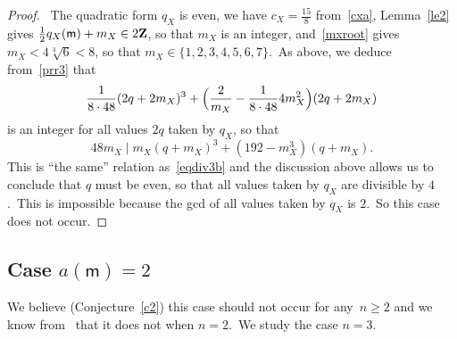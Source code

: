 \documentclass[12pt]{amsart}
\def\Z{{\bf Z}}
\def\R{{\bf R}}
\DeclareMathOperator{\ch}{ch}
\theoremstyle{remark}
\newtheorem{rema}[lemm]{Remark}
\def\lll{\ensuremath{\mathsf l}}
\def\mm{\ensuremath{\mathsf m}}
\begin{document}
\begin{proof}
\noindent{\bf{Assume  $ q_X(\lll,\mm)=2$.}}\ The quadratic form $q_X$ is even, we have $c_X=\frac{15}8$ from~\eqref{cxa},   Lemma~\ref{le2} gives $\frac12 q_X(\mm)+ m_X\in 2\Z$, so that $m_X$ is an integer, and~\eqref{mxroot} gives $m_X<4\sqrt[3]{6}<8$, so that $m_X \in\{1,2,3,4,5,6,7\}$.\ As above, we  deduce from~\eqref{prr3} that
 $$ \frac{1}{8\cdot 48}(2q+ 2m_X)^3+\Bigl(\frac{2}{m_X}-\frac{1}{8\cdot 48}4m_X^2\Bigr)(2q+ 2m_X) $$
is an integer for all values $2q$ taken by $q_X$, so that 
$$48m_X\mid    m_X(q+m_X)^3+ (192- m_X^3 )(q+m_X).
$$
This is ``the same'' relation as~\eqref{eqdiv3b} and the discussion above allows us to conclude that $q$ must be even, so that all values taken by $q_X$ are divisible by $4$.\ This is   impossible because   the gcd of all values taken  by $q_X$ is  $2$.\ So this case does not occur. 
%
\end{proof}




\subsection{Case  $a(\mm)=2$}   We believe (Conjecture~\ref{c2})  this case should not     occur for any~$n\ge2$ and we know from~\cite[Theorem~9.3]{dhmv} that it does not when $n=2$.\ We study the case $n=3$.
\end{document}

